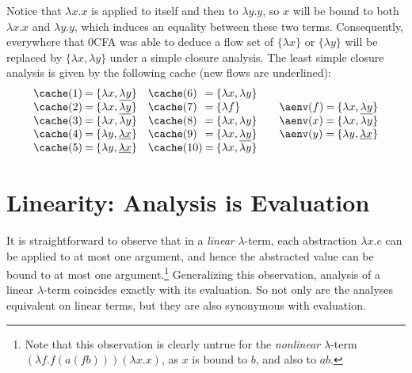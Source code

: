 Notice that $\lambda x.x$ is applied to itself and then to $\lambda
y.y$, so $x$ will be bound to both $\lambda x.x$ and $\lambda y.y$,
which induces an equality between these two terms.  Consequently,
everywhere that 0CFA was able to deduce a flow set of $\{ \lambda x
\}$ or $\{ \lambda y \}$ will be replaced by $\{ \lambda x, \lambda y
\}$ under a simple closure analysis.  The least simple closure
analysis is given by the following cache (new flows are underlined):
\begin{displaymath}
\begin{array}{l@{\:=\:}l@{\hspace{10pt}}l@{\:=\:}l}
\cache(1) & \{ \lambda x, \underline{\lambda y} \} &
\cache(6) & \{ \lambda x, \lambda y \} \\
\cache(2) & \{ \lambda x, \underline{\lambda y} \} &
\cache(7) & \{ \lambda f \} \\
\cache(3) & \{ \lambda x, \lambda y \} &
\cache(8) & \{ \lambda x, \lambda y \} \\
\cache(4) & \{ \lambda y, \underline{\lambda x} \} &
\cache(9) & \{ \lambda x, \underline{\lambda y} \} \\
\cache(5) & \{ \lambda y, \underline{\lambda x} \} &
\cache(10)& \{ \lambda x, \lambda y \}
\end{array}
\hspace{10pt}
\begin{array}{l@{\:=\:}l}
\aenv(f) & \{ \lambda x, \underline{\lambda y} \} \\
\aenv(x) & \{ \lambda x, \lambda y \}\\
\aenv(y) & \{ \lambda y, \underline{\lambda x} \}
\end{array}
\end{displaymath}

\section{Linearity: Analysis is Evaluation}
\label{sec:linearity}

It is straightforward to observe that in a {\em linear}
$\lambda$-term, each abstraction $\lambda x.e$ can be applied to at
most one argument, and hence the abstracted value can be bound to at
most one argument.\footnote{Note that this observation is clearly
untrue for the {\em nonlinear} $\lambda$-term $(\lambda f.f (a (f b)))
(\lambda x.x)$, as $x$ is bound to $b$, and also to $ab$.}
Generalizing this observation, analysis of a linear $\lambda$-term
coincides exactly with its evaluation.  So not only are the analyses
equivalent on linear terms, but they are also synonymous with
evaluation.

